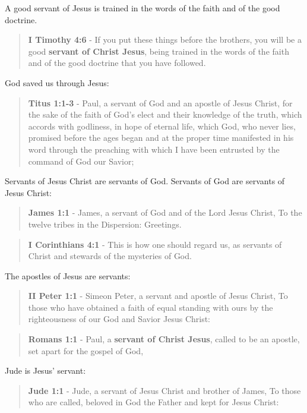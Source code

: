 \documentclass[11pt]{article}
\begin{document}
A good servant of Jesus is trained in the words of the faith and of the good doctrine.

\begin{quote}
\textbf{I Timothy 4:6} - If you put these things before the brothers, you will be a good \textbf{servant of Christ Jesus}, being trained in the words of the faith and of the good doctrine that you have followed.
\end{quote}

God saved us through Jesus:

\begin{quote}
\textbf{Titus 1:1-3} - Paul, a servant of God and an apostle of Jesus Christ, for the sake of the faith of God's elect and their knowledge of the truth, which accords with godliness, in hope of eternal life, which God, who never lies, promised before the ages began and at the proper time manifested in his word through the preaching with which I have been entrusted by the command of God our Savior;
\end{quote}

Servants of Jesus Christ are servants of God. Servants of God are servants of Jesus Christ:

\begin{quote}
\textbf{James 1:1} - James, a servant of God and of the Lord Jesus Christ, To the twelve tribes in the Dispersion: Greetings.
\end{quote}

\begin{quote}
\textbf{I Corinthians 4:1} - This is how one should regard us, as servants of Christ and stewards of the mysteries of God.
\end{quote}

The apostles of Jesus are servants:

\begin{quote}
\textbf{II Peter 1:1} - Simeon Peter, a servant and apostle of Jesus Christ, To those who have obtained a faith of equal standing with ours by the righteousness of our God and Savior Jesus Christ:
\end{quote}

\begin{quote}
\textbf{Romans 1:1} - Paul, a \textbf{servant of Christ Jesus}, called to be an apostle, set apart for the gospel of God,
\end{quote}

Jude is Jesus' servant:

\begin{quote}
\textbf{Jude 1:1} - Jude, a servant of Jesus Christ and brother of James, To those who are called, beloved in God the Father and kept for Jesus Christ:
\end{quote}
\end{document}
